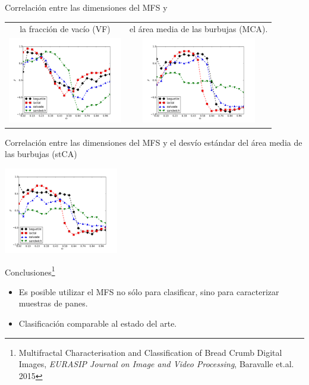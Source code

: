 \documentclass[spanish,unknownkeysallowed,10pt]{beamer}
\begin{document}
\begin{frame}
Correlación entre las dimensiones del MFS y \\

\vspace{1cm}

\begin{tabular}{cc}
la fracción de vacío (VF) & el área media de las burbujas (MCA). \\
\includegraphics[width=5cm]{../figures/VF} & \includegraphics[width=5cm]{../figures/MCA} \\
\end{tabular}

\end{frame}

\begin{frame}
Correlación entre las dimensiones del MFS y el desvío estándar del área media de las burbujas (stCA)

\centerline{\includegraphics[width=5cm]{../figures/stMCA}}



Conclusiones\footnote{Multifractal Characterisation and Classification of Bread Crumb Digital Images, {\it EURASIP Journal on Image and Video Processing}, Baravalle et.al. 2015}
\begin{itemize}
\item Es posible utilizar el MFS no sólo para clasificar, sino para caracterizar muestras de panes.
\item Clasificación comparable al estado del arte.
\end{itemize}
\end{frame}
\end{document}
